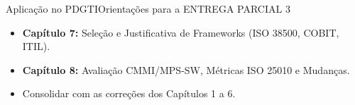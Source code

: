 \begin{senaiframe}{Aplicação no PDGTI}{Orientações para a ENTREGA PARCIAL 3}
  \vspace{0.5cm}
  \begin{tcolorbox}[senaigreencard, title={Entrega Parcial 3 (Capítulos 7 e 8) – Data: 30/Out}]
    \begin{itemize}
      \item \textbf{Capítulo 7:} Seleção e Justificativa de Frameworks (ISO 38500, COBIT, ITIL).
      \item \textbf{Capítulo 8:} Avaliação CMMI/MPS-SW, Métricas ISO 25010 e Mudanças.
      \item Consolidar com as correções dos Capítulos 1 a 6.
    \end{itemize}
  \end{tcolorbox}
\end{senaiframe}

